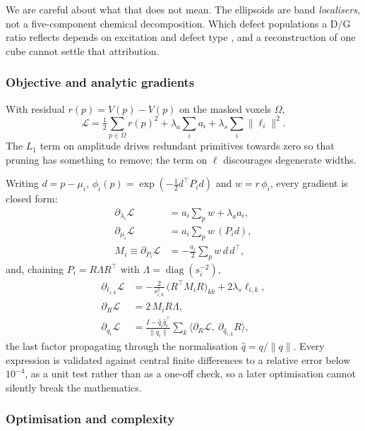We are careful about what that does not mean. The ellipsoids are band
\emph{localisers}, not a five-component chemical decomposition. Which defect
populations a $\mathrm{D/G}$ ratio reflects depends on excitation and defect
type \cite{cancado2017disorder}, and a reconstruction of one cube cannot
settle that attribution.

\subsubsection{Objective and analytic gradients}

With residual $r(p)=\widehat V(p)-V(p)$ on the masked voxels $\Omega$,
\begin{equation}
\mathcal{L}=\tfrac12\!\sum_{p\in\Omega}\! r(p)^2
+\lambda_a\!\sum_i a_i
+\lambda_s\!\sum_i \lVert \ell_i\rVert^2 .
\end{equation}
The $L_1$ term on amplitude drives redundant primitives towards zero so that
pruning has something to remove; the term on $\ell$ discourages degenerate
widths.

Writing $d = p-\mu_i$, $\phi_i(p)=\exp(-\tfrac12 d^\top P_i d)$ and
$w = r\,\phi_i$, every gradient is closed form:
\begin{align}
\partial_{\lambda_i}\mathcal L &= a_i\!\sum_p w + \lambda_a a_i,\\
\partial_{\mu_i}\mathcal L &= a_i\!\sum_p w\,(P_i d),\\
M_i \equiv \partial_{P_i}\mathcal L &= -\tfrac{a_i}{2}\!\sum_p w\, d\,d^\top,
\end{align}
and, chaining $P_i=R\Lambda R^\top$ with $\Lambda=\operatorname{diag}(s_i^{-2})$,
\begin{align}
\partial_{\ell_{i,k}}\mathcal L &= -\frac{2}{s_{i,k}^2}\,\big(R^\top M_i R\big)_{kk}
  + 2\lambda_s \ell_{i,k},\\
\partial_{R}\mathcal L &= 2\,M_i R \Lambda,\\
\partial_{q_i}\mathcal L &= \frac{I-\hat q_i\hat q_i^\top}{\lVert q_i\rVert}
  \sum_k \big\langle \partial_R\mathcal L,\  \partial_{\hat q_{i,k}}R\big\rangle ,
\end{align}
the last factor propagating through the normalisation $\hat q = q/\lVert q
\rVert$. Every expression is validated against central finite differences to a
relative error below $10^{-4}$, as a unit test rather than as a one-off check,
so a later optimisation cannot silently break the mathematics.

\subsubsection{Optimisation and complexity}
\label{sec:optimisation}

